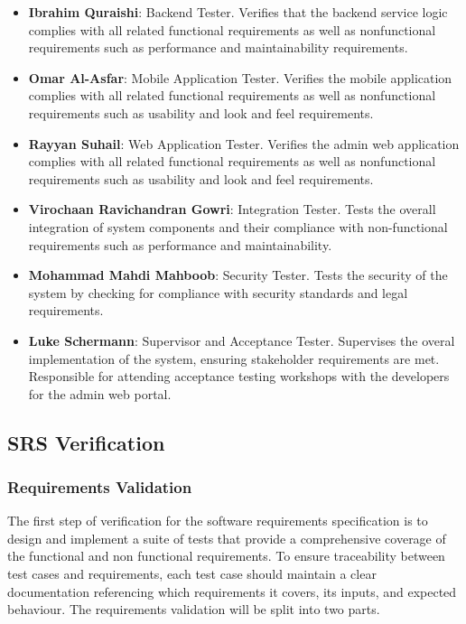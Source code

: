 \documentclass[12pt, titlepage]{article}
\begin{document}
\begin{itemize}
  \item \textbf{Ibrahim Quraishi}: Backend Tester. Verifies that the backend service logic complies with all related functional requirements as well as nonfunctional requirements such as performance and maintainability requirements.
  \item \textbf{Omar Al-Asfar}: Mobile Application Tester. Verifies the mobile application complies with all related functional requirements as well as nonfunctional requirements such as usability and look and feel requirements.
  \item \textbf{Rayyan Suhail}: Web Application Tester. Verifies the admin web application complies with all related functional requirements as well as nonfunctional requirements such as usability and look and feel requirements. 
  \item \textbf{Virochaan Ravichandran Gowri}: Integration Tester. Tests the overall integration of system components and their compliance with non-functional requirements such as performance and maintainability.
  \item \textbf{Mohammad Mahdi Mahboob}: Security Tester. Tests the security of the system by checking for compliance with security standards and legal requirements.
  \item \textbf{Luke Schermann}: Supervisor and Acceptance Tester. Supervises the overal implementation of the system, ensuring stakeholder requirements are met. Responsible for attending acceptance testing workshops with the developers for the admin web portal.
\end{itemize}

\subsection{SRS Verification}

\subsubsection{Requirements Validation}
The first step of verification for the software requirements specification is to design and implement a suite of tests that provide a comprehensive coverage of the functional and non functional requirements. To ensure traceability between test cases and requirements, each test case should maintain a clear documentation referencing which requirements it covers, its inputs, and expected behaviour. The requirements validation will be split into two parts. 
\end{document}
